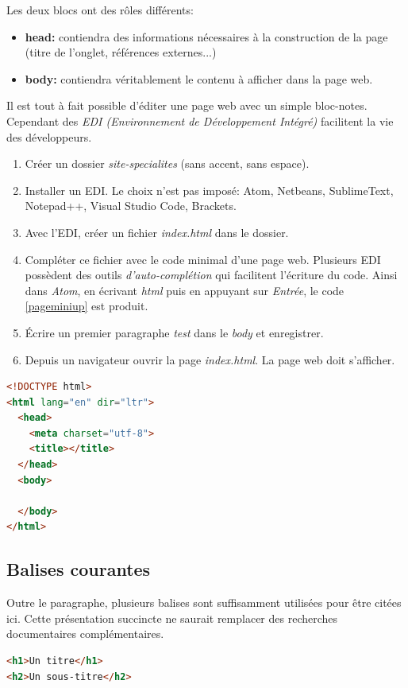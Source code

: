\documentclass[a4paper,11pt]{article}
\begin{document}
\begin{Form}
Les deux blocs ont des rôles différents:
\begin{itemize}
\item \textbf{head:} contiendra des informations nécessaires à la construction de la page (titre de l'onglet, références externes...)
\item \textbf{body:} contiendra véritablement le contenu à afficher dans la page web.
\end{itemize}
\begin{activite}
Il est tout à fait possible d'éditer une page web avec un simple bloc-notes. Cependant des \emph{EDI (Environnement de Développement Intégré)} facilitent la vie des développeurs.
\begin{enumerate}
\item Créer un dossier \emph{site-specialites} (sans accent, sans espace).
\item Installer un EDI. Le choix n'est pas imposé: Atom, Netbeans, SublimeText, Notepad++, Visual Studio Code, Brackets.
\item Avec l'EDI, créer un fichier \emph{index.html} dans le dossier.
\item Compléter ce fichier avec le code minimal d'une page web. Plusieurs EDI possèdent des outils \emph{d'auto-complétion} qui facilitent l'écriture du code. Ainsi dans \emph{Atom}, en écrivant \emph{html} puis en appuyant sur \emph{Entrée}, le code \ref{pageminiup} est produit.
\item Écrire un premier paragraphe \emph{test} dans le \emph{body} et enregistrer.
\item Depuis un navigateur ouvrir la page \emph{index.html}. La page web doit s'afficher.
\end{enumerate}
\end{activite}
\begin{code}[!h]
\begin{lstlisting}[language=html]
<!DOCTYPE html>
<html lang="en" dir="ltr">
  <head>
    <meta charset="utf-8">
    <title></title>
  </head>
  <body>
    
  </body>
</html>
\end{lstlisting}
\label{pageminiup}
\end{code}
\subsection{Balises courantes}
Outre le paragraphe, plusieurs balises sont suffisamment utilisées pour être citées ici. Cette présentation succincte ne saurait remplacer des recherches documentaires complémentaires.
\begin{center}
\begin{lstlisting}[language=html]
<h1>Un titre</h1>
<h2>Un sous-titre</h2>
\end{lstlisting}
\label{moncode}
\end{center}


\end{Form}
\end{document}
